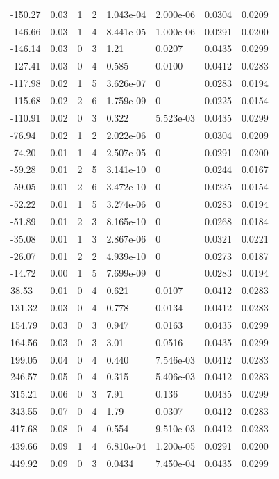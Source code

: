 \documentclass[preview]{standalone}
\begin{document}
{{\begin{tabular}{L{1.2cm}C{1.2cm} C{0.3cm}C{0.5cm} C{1.4cm}C{1.4cm} C{1.4cm}C{1.4cm}}
  -150.27  &  0.03  & 1     &  2 &  1.043e-04  & 2.000e-06  & 0.0304 &  0.0209   \\ 
  -146.66  &  0.03  & 1     &  4 &  8.441e-05  & 1.000e-06  & 0.0291 &  0.0200   \\ 
  -146.14  &  0.03  & 0     &  3 &  1.21  & 0.0207  & 0.0435 &  0.0299   \\ 
  -127.41  &  0.03  & 0     &  4 &  0.585  & 0.0100  & 0.0412 &  0.0283   \\ 
  -117.98  &  0.02  & 1     &  5 &  3.626e-07  & 0  & 0.0283 &  0.0194   \\ 
  -115.68  &  0.02  & 2     &  6 &  1.759e-09  & 0  & 0.0225 &  0.0154   \\ 
  -110.91  &  0.02  & 0     &  3 &  0.322  & 5.523e-03  & 0.0435 &  0.0299   \\ 
  -76.94  &  0.02  & 1     &  2 &  2.022e-06  & 0  & 0.0304 &  0.0209   \\ 
  -74.20  &  0.01  & 1     &  4 &  2.507e-05  & 0  & 0.0291 &  0.0200   \\ 
  -59.28  &  0.01  & 2     &  5 &  3.141e-10  & 0  & 0.0244 &  0.0167   \\ 
  -59.05  &  0.01  & 2     &  6 &  3.472e-10  & 0  & 0.0225 &  0.0154   \\ 
  -52.22  &  0.01  & 1     &  5 &  3.274e-06  & 0  & 0.0283 &  0.0194   \\ 
  -51.89  &  0.01  & 2     &  3 &  8.165e-10  & 0  & 0.0268 &  0.0184   \\ 
  -35.08  &  0.01  & 1     &  3 &  2.867e-06  & 0  & 0.0321 &  0.0221   \\ 
  -26.07  &  0.01  & 2     &  2 &  4.939e-10  & 0  & 0.0273 &  0.0187   \\ 
  -14.72  &  0.00  & 1     &  5 &  7.699e-09  & 0  & 0.0283 &  0.0194   \\ 
  38.53  &  0.01  & 0     &  4 &  0.621  & 0.0107  & 0.0412 &  0.0283   \\ 
  131.32  &  0.03  & 0     &  4 &  0.778  & 0.0134  & 0.0412 &  0.0283   \\ 
  154.79  &  0.03  & 0     &  3 &  0.947  & 0.0163  & 0.0435 &  0.0299   \\ 
  164.56  &  0.03  & 0     &  3 &  3.01  & 0.0516  & 0.0435 &  0.0299   \\ 
  199.05  &  0.04  & 0     &  4 &  0.440  & 7.546e-03  & 0.0412 &  0.0283   \\ 
  246.57  &  0.05  & 0     &  4 &  0.315  & 5.406e-03  & 0.0412 &  0.0283   \\ 
  315.21  &  0.06  & 0     &  3 &  7.91  & 0.136  & 0.0435 &  0.0299   \\ 
  343.55  &  0.07  & 0     &  4 &  1.79  & 0.0307  & 0.0412 &  0.0283   \\ 
  417.68  &  0.08  & 0     &  4 &  0.554  & 9.510e-03  & 0.0412 &  0.0283   \\ 
  439.66  &  0.09  & 1     &  4 &  6.810e-04  & 1.200e-05  & 0.0291 &  0.0200   \\ 
  449.92  &  0.09  & 0     &  3 &  0.0434  & 7.450e-04  & 0.0435 &  0.0299   \\ 
\hline 
\end{tabular} 

}}
\end{document}
